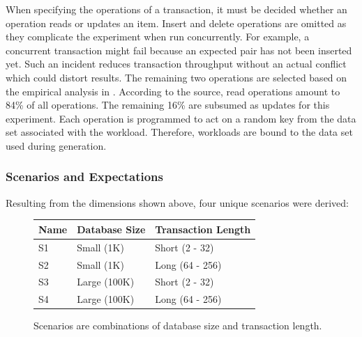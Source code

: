 When specifying the operations of a transaction, it must be decided whether an
operation reads or updates an item. Insert and delete operations are omitted as
they complicate the experiment when run concurrently. For example, a concurrent
transaction might fail because an expected pair has not been inserted yet. Such
an incident reduces transaction throughput without an actual conflict which
could distort results. The remaining two operations are selected based on the
empirical analysis in \cite{andrei2017sap}. According to the source, read
operations amount to 84\% of all operations. The remaining 16\% are subsumed as
updates for this experiment. Each operation is programmed to act on a random key from the data set associated with the workload. Therefore, workloads are bound to the data set used during generation.

\subsubsection{Scenarios and Expectations}

Resulting from the dimensions shown above, four unique scenarios  were derived:


\begin{figure}[!h]
    \centering
    \begin{tabular}{|l|l|l|}
        \hline
        \textbf{Name} & \textbf{Database Size} & \textbf{Transaction Length} \\
        \hline
        \hline
        S1            & Small (1K)             & Short (2 - 32)  \\
        S2            & Small (1K)             & Long (64 - 256) \\
        S3            & Large (100K)           & Short (2 - 32)  \\
        S4            & Large (100K)           & Long (64 - 256) \\
        \hline
    \end{tabular}
    \caption{Scenarios are combinations of database size and transaction length.}
    \label{tab:eval-scenarios}
\end{figure}

